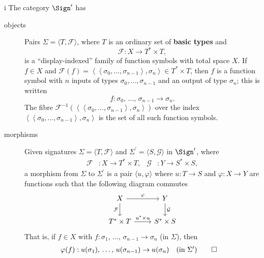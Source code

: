 \begin{partsolution}{i}
The category \(\Sign^\prime\) has
\begin{description}
\item[objects]
Pairs \(\Sigma = \langle T, \mathcal{F}\rangle\), where \(T\) is an ordinary set of \textbf{basic types} and
\begin{equation*}
\mathcal{F} : X \to T^* \times T,
\end{equation*}
is a ``display-indexed'' family of function symbols with total space \(X\).
If \(f \in X\) and \(\mathcal{F}(f) = \left\langle\left\langle\sigma_0,\ldots,\sigma_{n-1}\right\rangle,\sigma_n\right\rangle \in T^* \times T\), then \(f\) is a function symbol with \(n\) inputs of types \(\sigma_0, \ldots, \sigma_{n-1}\) and an output of type \(\sigma_n\); this is written
\begin{equation*}
f : \sigma_0,\,\ldots,\,\sigma_{n-1} \to \sigma_n.
\end{equation*}
The fibre \(\mathcal{F}^{-1}\left(\left\langle\left\langle\sigma_0,\ldots,\sigma_{n-1}\right\rangle,\sigma_n\right\rangle\right)\) over the index \(\left\langle\left\langle\sigma_0,\ldots,\sigma_{n-1}\right\rangle,\sigma_n\right\rangle\) is the set of all such function symbols.
\item[morphisms]
Given signatures \(\Sigma = \langle T, \mathcal{F}\rangle\) and \(\Sigma^\prime = \langle S, \mathcal{G}\rangle\) in \(\Sign^\prime\), where 
\begin{align*}
\mathcal{F} &: X \to T^* \times T, &
\mathcal{G} &: Y \to S^* \times S,
\end{align*}
a morphism from \(\Sigma\) to \(\Sigma^\prime\) is a pair \(\langle u, \varphi\rangle\) where \(u : T \to S\) and \(\varphi : X \to Y\) are functions such that the following diagram commutes
\begin{equation*}
\begin{tikzcd}
X \arrow[r, "\varphi"] \arrow[d, "\mathcal{F}"{left}]
& Y \arrow[d, "\mathcal{G}"{right}] \\
T^* \times T \arrow[r, "u^* \times u"]
& S^* \times S
\end{tikzcd}
\end{equation*}
That is, if \(f \in X\) with \(f : \sigma_1,\,\ldots,\,\sigma_{n-1}\to\sigma_n\) (in \(\Sigma\)), then
\begin{align*}
\varphi(f) &: u(\sigma_1),\, \ldots,\, u(\sigma_{n-1}) \to u(\sigma_n)
&&\text{(in \(\Sigma^\prime\))}
\qedhere
\end{align*}
\end{description}
\end{partsolution}

